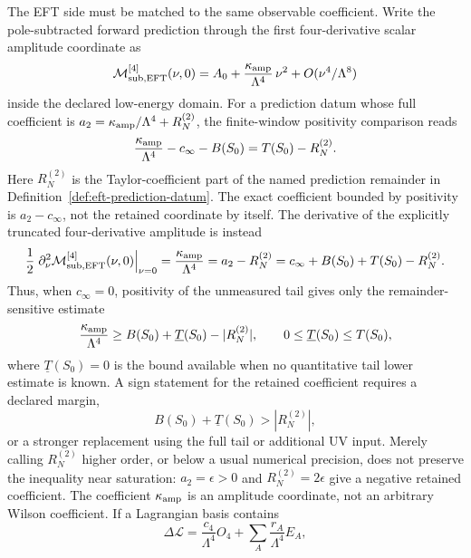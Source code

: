 The EFT side must be matched to the same observable coefficient.  Write the
pole-subtracted forward prediction through the first four-derivative scalar
amplitude coordinate as
\begin{equation}
  \mathcal M_{\rm sub,EFT}^{[4]}(\nu,0)
  =
  A_0
  +
  \frac{\kappa_{\rm amp}}{\Lambda^4}\,\nu^2
  +
  O(\nu^4/\Lambda^8)
\label{eq:eft-forward-amplitude-coordinate}
\end{equation}
inside the declared low-energy domain.  For a prediction datum whose full
coefficient is
\(a_2=\kappa_{\rm amp}/\Lambda^4+R_N^{(2)}\), the finite-window positivity
comparison reads
\begin{equation}
  \frac{\kappa_{\rm amp}}{\Lambda^4}
  -c_\infty-B(S_0)
  =
  T(S_0)-R_N^{(2)} .
\label{eq:eft-forward-window-positivity-comparison}
\end{equation}
Here \(R_N^{(2)}\) is the Taylor-coefficient part of the named prediction
remainder in Definition~\ref{def:eft-prediction-datum}.  The exact coefficient
bounded by positivity is \(a_2-c_\infty\), not the retained coordinate by
itself.  The derivative of the explicitly truncated four-derivative amplitude
is instead
\begin{equation}
  \frac12\left.
  \partial_\nu^2\mathcal M_{\rm sub,EFT}^{[4]}(\nu,0)
  \right|_{\nu=0}
  =
  \frac{\kappa_{\rm amp}}{\Lambda^4}
  =
  a_2-R_N^{(2)}
  =
  c_\infty+B(S_0)+T(S_0)-R_N^{(2)} .
\label{eq:eft-forward-kappa-margin}
\end{equation}
Thus, when \(c_\infty=0\), positivity of the unmeasured tail gives only the
remainder-sensitive estimate
\begin{equation}
  \frac{\kappa_{\rm amp}}{\Lambda^4}
  \ge
  B(S_0)+\underline T(S_0)-|R_N^{(2)}|,
  \qquad
  0\le \underline T(S_0)\le T(S_0),
\label{eq:eft-forward-kappa-margin-bound}
\end{equation}
where \(\underline T(S_0)=0\) is the bound available when no quantitative tail
lower estimate is known.  A sign statement for the retained coefficient
requires a declared margin,
\[
  B(S_0)+\underline T(S_0)>|R_N^{(2)}|,
\]
or a stronger replacement using the full tail or additional UV input.  Merely
calling \(R_N^{(2)}\) higher order, or below a usual numerical precision, does
not preserve the inequality near saturation: \(a_2=\epsilon>0\) and
\(R_N^{(2)}=2\epsilon\) give a negative retained coefficient.  The coefficient
\(\kappa_{\rm amp}\) is an amplitude coordinate, not an arbitrary Wilson
coefficient.  If a Lagrangian basis
contains
\[
  \Delta\mathcal L
  =
  \frac{c_4}{\Lambda^4}O_4
  +
  \sum_A \frac{r_A}{\Lambda^4}E_A ,
\]

